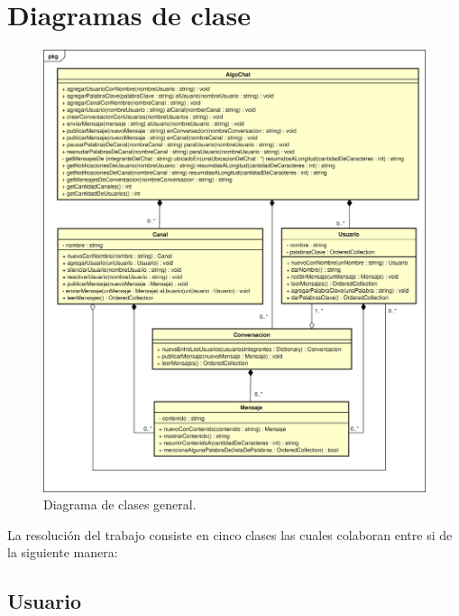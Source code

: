 \documentclass[titlepage,a4paper]{article}
\begin{document}
\newpage
\section{Diagramas de clase}\label{sec:diagramasdeclase}

\begin{figure}[H]
	\centering
	\includegraphics[width=1\textwidth]{diagrama_clase01.png}
	\caption{\label{fig:class01}Diagrama de clases general.}
\end{figure}

La resolución del trabajo consiste en cinco clases las cuales colaboran entre si de la siguiente manera:

\subsection{Usuario}\label{subsec:usuario}
\end{document}
